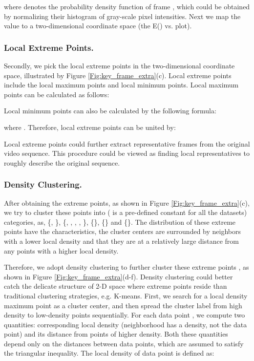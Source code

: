 \documentclass[5p]{elsarticle}
\begin{document}
where  denotes the probability density function of frame , which could be obtained by normalizing their histogram of gray-scale pixel intensities.
Next we map the value  to a two-dimensional coordinate space (the E() vs.  plot).

\subsubsection{Local Extreme Points.}
Secondly, we pick the local extreme points in the two-dimensional coordinate space, illustrated by Figure \ref{Fig:key_frame_extra}(c).
Local extreme points include the local maximum points and local minimum points.
Local maximum points can be calculated as follows:

Local minimum points can also be calculated by the following formula:

where .
Therefore, local extreme points  can be united by:


Local extreme points could further extract representative frames from the original video sequence.
This procedure could be viewed as finding local representatives to roughly describe the original sequence.

\subsubsection{Density Clustering.}
After obtaining the extreme points, as shown in Figure \ref{Fig:key_frame_extra}(c), we try to cluster these points into  ( is a pre-defined constant for all the datasets) categories, as, \{, \}, \{, , , , \}, \{\}, \{\} and \{\}.
The distribution of these extreme points have the characteristics, the cluster centers are surrounded by neighbors with a lower local density and that they are at a relatively large distance from any points with a higher local density.

Therefore, we adopt density clustering  \cite{rodriguez2014clustering}  to further cluster these extreme points , as shown in Figure \ref{Fig:key_frame_extra}(d-f).
Density clustering could better catch the delicate structure of 2-D space where extreme points reside than traditional clustering strategies, e.g. K-means.
First, we search for a local density maximum point as a cluster center, and then spread the cluster label from high density to low-density points sequentially.
For each data point , we compute two quantities: corresponding local density (neighborhood has a density, not the data point)  and its distance  from points of higher density.
Both these quantities depend only on the distances  between data points, which are assumed to satisfy the triangular inequality.
The local density  of data point  is defined as:
\end{document}
